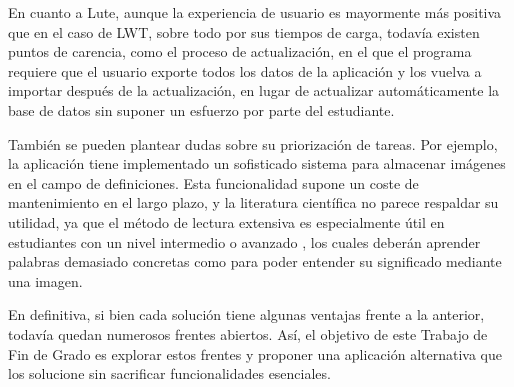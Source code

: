 En cuanto a Lute, aunque la experiencia de usuario es mayormente más positiva que en el caso de LWT, sobre todo por sus tiempos de carga, todavía existen puntos de carencia, como el proceso de actualización, en el que el programa requiere que el usuario exporte todos los datos de la aplicación y los vuelva a importar después de la actualización, en lugar de actualizar automáticamente la base de datos sin suponer un esfuerzo por parte del estudiante.

También se pueden plantear dudas sobre su priorización de tareas. Por ejemplo, la aplicación tiene implementado un sofisticado sistema para almacenar imágenes en el campo de definiciones. Esta funcionalidad supone un coste de mantenimiento en el largo plazo, y la literatura científica no parece respaldar su utilidad, ya que el método de lectura extensiva es especialmente útil en estudiantes con un nivel intermedio o avanzado \citationNeeded, los cuales deberán aprender palabras demasiado concretas como para poder entender su significado mediante una imagen.

En definitiva, si bien cada solución tiene algunas ventajas frente a la anterior, todavía quedan numerosos frentes abiertos. Así, el objetivo de este Trabajo de Fin de Grado es explorar estos frentes y proponer una aplicación alternativa que los solucione sin sacrificar funcionalidades esenciales.

